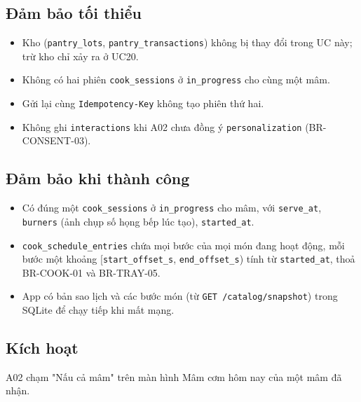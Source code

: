\subsection{Đảm bảo tối thiểu}
\begin{itemize}
\item Kho ({\small\texttt{pantry\_\allowbreak{}\allowbreak{}lots}}, {\small\texttt{pantry\_\allowbreak{}\allowbreak{}transactions}}) không bị thay đổi trong UC này; trừ kho chỉ xảy ra ở UC20.
\item Không có hai phiên {\small\texttt{cook\_\allowbreak{}\allowbreak{}sessions}} ở {\small\texttt{in\_\allowbreak{}\allowbreak{}progress}} cho cùng một mâm.
\item Gửi lại cùng {\small\texttt{Idempotency-\allowbreak{}Key}} không tạo phiên thứ hai.
\item Không ghi {\small\texttt{interactions}} khi A02 chưa đồng ý {\small\texttt{personalization}} (BR-\allowbreak{}CONSENT-\allowbreak{}03).
\end{itemize}
\subsection{Đảm bảo khi thành công}
\begin{itemize}
\item Có đúng một {\small\texttt{cook\_\allowbreak{}\allowbreak{}sessions}} ở {\small\texttt{in\_\allowbreak{}\allowbreak{}progress}} cho mâm, với {\small\texttt{serve\_\allowbreak{}\allowbreak{}at}}, {\small\texttt{burners}} (ảnh chụp số họng bếp lúc tạo), {\small\texttt{started\_\allowbreak{}\allowbreak{}at}}.
\item {\small\texttt{cook\_\allowbreak{}\allowbreak{}schedule\_\allowbreak{}\allowbreak{}entries}} chứa mọi bước của mọi món đang hoạt động, mỗi bước một khoảng [{\small\texttt{start\_\allowbreak{}\allowbreak{}offset\_\allowbreak{}\allowbreak{}s}}, {\small\texttt{end\_\allowbreak{}\allowbreak{}offset\_\allowbreak{}\allowbreak{}s}}) tính từ {\small\texttt{started\_\allowbreak{}\allowbreak{}at}}, thoả BR-\allowbreak{}COOK-\allowbreak{}01 và BR-\allowbreak{}TRAY-\allowbreak{}05.
\item App có bản sao lịch và các bước món (từ {\small\texttt{GET /\allowbreak{}\allowbreak{}catalog/\allowbreak{}\allowbreak{}snapshot}}) trong SQLite để chạy tiếp khi mất mạng.
\end{itemize}
\subsection{Kích hoạt}
A02 chạm "Nấu cả mâm" trên màn hình Mâm cơm hôm nay của một mâm đã nhận.


